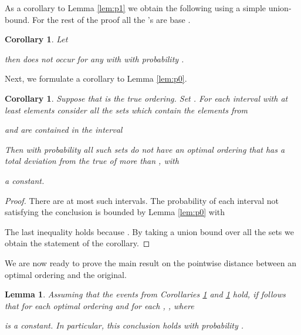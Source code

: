\documentclass[11pt]{article}
\newtheorem{cor}[theorem]{Corollary}
\newtheorem{lemma}[theorem]{Lemma}
\begin{document}
As a corollary to Lemma \ref{lem:p1} we obtain the following using a simple
union-bound. For the rest of the proof all the 's are base . 

\begin{cor}
\label{cor:p1}
Let 

 then  does not occur for any  with
 with probability .
\end{cor}

Next, we formulate a corollary to Lemma \ref{lem:p0}. 

\begin{cor}
\label{cor:p0}
 Suppose that  is 
the true ordering. Set . For each interval  with
at least  elements consider 
all the sets   which   contain the elements from

and are contained in the interval 

Then with probability  all such sets  do not have an optimal ordering that has 
a total deviation
from the true of more than , with 

 a constant.
\end{cor}


\begin{proof}
There are at most  such intervals. The probability of each interval
not satisfying the conclusion is bounded by Lemma \ref{lem:p0} with 

The last inequality holds because .
By taking a union bound over all the sets we obtain the statement of the corollary. 
\end{proof}












We are now ready to prove the main result on the pointwise distance between an optimal 
ordering and the original. 

\begin{lemma}
\label{lem:pmain}
Assuming that the events from Corollaries \ref{cor:p1} and \ref{cor:p0} hold, 
if follows that for each optimal ordering  and for each , , 
where 

 is a constant.
 In particular, this conclusion holds with probability .
\end{lemma}
\end{document}
